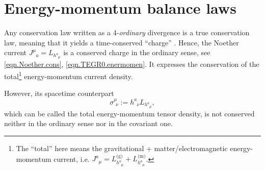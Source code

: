 \documentclass[
10pt, %
a4paper, %
oneside, %
twocolumn,
headinclude,footinclude, %
BCOR5mm, %
]{scrartcl}
\newcommand{\pd}[1]{\partial_{#1}}
\newcommand{\tetrsymbol}{h}
\newcommand{\tetr}[2]{\tetrsymbol^{#1}_{\phantom{#1}#2}}
\newcommand{\D}[1]{\partial_{#1}} %
\newcommand{\Tors}[2]{T^{#1}_{\phantom{#1}#2}}
\newcommand{\Laghodge}{L}%
\newcommand{\EMmat}[2]{\sigma^{#1}_{\ \,#2}}
\newcommand{\LCsymb}{\bm{\in}}    %
\newcommand{\HDT}[1]{\accentset{\star}{T}^{#1}}
\newcommand{\NC}[2]{J^{#2}_{\phantom{#2}#1}}
\begin{document}
	
	\section{Energy-momentum balance laws}
	
	Any conservation law written as a  4-\emph{ordinary} divergence is a
	true conservation law, meaning that it yields a time-conserved 
	``charge'' \cite{AldrovandiPereiraBook}. Hence, the Noether current $ \NC{a}{\mu} 
	=\Laghodge_{\tetr{a}{\mu}}$ is a conserved charge in the ordinary sense, see 
	\eqref{eqn.Noether.cons}, \eqref{eqn.TEGR0.enermomen}. It expresses the conservation of the 
	total\footnote{The ``total'' here 
		means the gravitational + matter/electromagnetic energy-momentum current, i.e. $ 
		\NC{\mu}{a} = \Laghodge^\text{(g)}_{\tetr{a}{\mu}} + \Laghodge^\text{(m)}_{\tetr{a}{\mu}} 
		$.} 
	energy-momentum current density. 
	
	However, its spacetime counterpart 
	\begin{equation}\label{eqn.stress}
		\EMmat{\mu}{\nu}:=\tetr{a}{\nu} L_{\tetr{a}{\mu}},
	\end{equation}
	which can be called the total energy-momentum tensor density, is not
	conserved neither in the ordinary sense nor in the covariant one.
	
\end{document}
